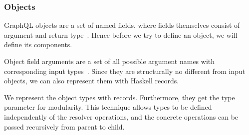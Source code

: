 \begin{frame}\frametitle{Objects}




GraphQL objects are a set of named fields, where fields themselves consist of argument and return type~\cite{gql-spec}. Hence before we try to define an object, we will define its components.

Object field arguments are a set of all possible argument names with corresponding input types~\cite{gql-spec}. Since they are structurally no different from input objects, we can also represent them with Haskell records. 


We represent the object types with records. Furthermore, they get the type parameter  for modularity.
This technique allows types to be defined independently of the resolver operations, and the concrete operations can be passed recursively from parent to child. 


\end{frame}

